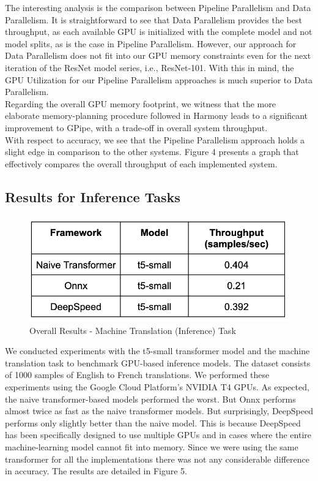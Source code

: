\documentclass[conference]{IEEEtran}
\begin{document}
The interesting analysis is the comparison between Pipeline Parallelism and Data Parallelism. It is straightforward to see that Data Parallelism provides the best throughput, as each available GPU is initialized with the complete model and not model splits, as is the case in Pipeline Parallelism. However, our approach for Data Parallelism does not fit into our GPU memory constraints even for the next iteration of the ResNet model series, i.e., ResNet-101. With this in mind, the GPU Utilization for our Pipeline Parallelism approaches is much superior to Data Parallelism. \\
Regarding the overall GPU memory footprint, we witness that the more elaborate memory-planning procedure followed in Harmony leads to a significant improvement to GPipe, with a trade-off in overall system throughput. \\
With respect to accuracy, we see that the Pipeline Parallelism approach holds a slight edge in comparison to the other systems. Figure 4 presents a graph that effectively compares the overall throughput of each implemented system.

\subsection{Results for Inference Tasks}
\begin{figure}[t]
	\centering
	\includegraphics[scale=0.42]{Screenshots/Inference_Pic.png}
	\caption{Overall Results - Machine Translation (Inference) Task}
	\label{fig}
\end{figure}

We conducted experiments with the t5-small transformer model and the machine translation task to benchmark GPU-based inference models. The dataset consists of 1000 samples of English to French translations. We performed these experiments using the Google Cloud Platform's NVIDIA T4 GPUs. 
As expected, the naive transformer-based models performed the worst. But Onnx performs almost twice as fast as the naive transformer models. But surprisingly, DeepSpeed performs only slightly better than the naive model. This is because DeepSpeed has been specifically designed to use multiple GPUs and in cases where the entire machine-learning model cannot fit into memory. Since we were using the same transformer for all the implementations there was not any considerable difference in accuracy. The results are detailed in Figure 5.
\end{document}
